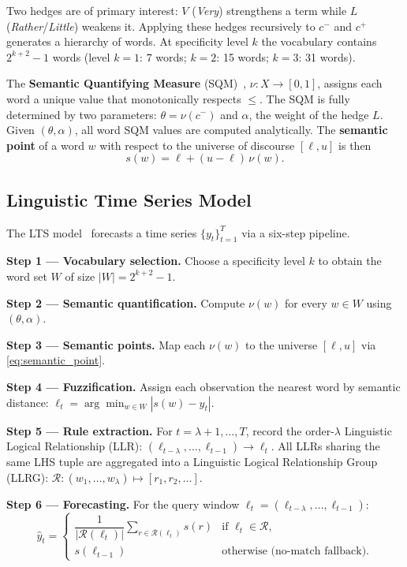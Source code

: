 \documentclass[conference]{IEEEtran}
\begin{document}
Two hedges are of primary interest: $V$ (\emph{Very}) strengthens a
term while $L$ (\emph{Rather}/\emph{Little}) weakens it. Applying
these hedges recursively to $c^-$ and $c^+$ generates a hierarchy of
words. At specificity level $k$ the vocabulary contains $2^{k+2}-1$
words (level $k=1$: 7 words; $k=2$: 15 words; $k=3$: 31 words).

The \textbf{Semantic Quantifying Measure} (SQM)~\cite{catho2002sqm},
$\nu : X \to [0, 1]$, assigns each word a unique value that
monotonically respects $\leq$. The SQM is fully determined by two
parameters: $\theta = \nu(c^-)$ and $\alpha$, the weight of the hedge
$L$. Given $(\theta, \alpha)$, all word SQM values are computed
analytically. The \textbf{semantic point} of a word $w$ with respect
to the universe of discourse $[\ell, u]$ is then
\begin{equation}
  s(w) = \ell + (u - \ell)\,\nu(w).
\label{eq:semantic_point}
\end{equation}

\subsection{Linguistic Time Series Model}

The LTS model~\cite{hieu2020lts} forecasts a time series
$\{y_t\}_{t=1}^{T}$ via a six-step pipeline.

\textbf{Step 1 — Vocabulary selection.}
Choose a specificity level $k$ to obtain the word set $W$ of size
$|W| = 2^{k+2}-1$.

\textbf{Step 2 — Semantic quantification.}
Compute $\nu(w)$ for every $w \in W$ using $(\theta, \alpha)$.

\textbf{Step 3 — Semantic points.}
Map each $\nu(w)$ to the universe $[\ell, u]$ via \eqref{eq:semantic_point}.

\textbf{Step 4 — Fuzzification.}
Assign each observation the nearest word by semantic distance:
$\ell_t = \arg\min_{w \in W} |s(w) - y_t|$.

\textbf{Step 5 — Rule extraction.}
For $t = \lambda{+}1, \ldots, T$, record the order-$\lambda$
Linguistic Logical Relationship (LLR):
$(\ell_{t-\lambda}, \ldots, \ell_{t-1}) \to \ell_t$.
All LLRs sharing the same LHS tuple are aggregated into a Linguistic
Logical Relationship Group (LLRG):
$\mathcal{R} : (w_1,\ldots,w_\lambda) \mapsto [r_1, r_2, \ldots]$.

\textbf{Step 6 — Forecasting.}
For the query window
$\bm{\ell}_t = (\ell_{t-\lambda}, \ldots, \ell_{t-1})$:
\begin{equation}
  \hat{y}_t =
  \begin{cases}
    \dfrac{1}{|\mathcal{R}(\bm{\ell}_t)|}
    \displaystyle\sum_{r \in \mathcal{R}(\bm{\ell}_t)} s(r)
    & \text{if } \bm{\ell}_t \in \mathcal{R}, \\[6pt]
    s(\ell_{t-1})
    & \text{otherwise (no-match fallback).}
  \end{cases}
\label{eq:lts_forecast}
\end{equation}
\end{document}
